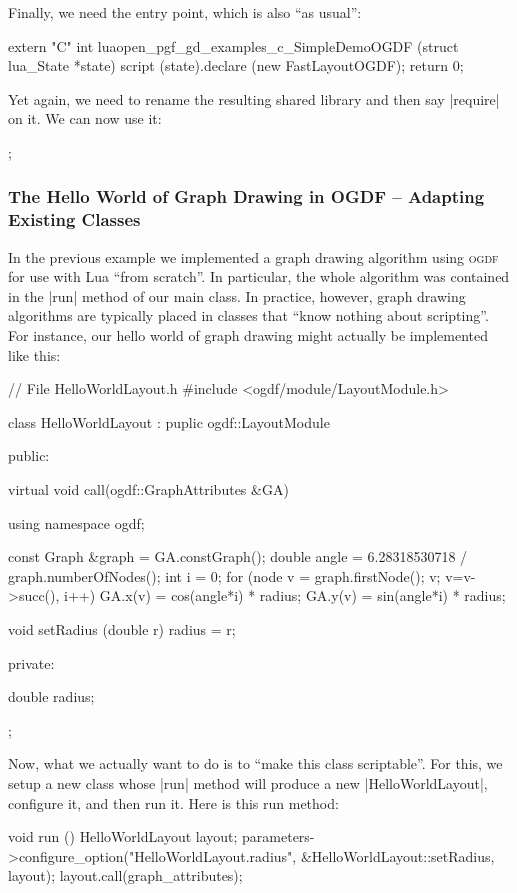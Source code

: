 Finally, we need the entry point, which is also ``as usual'':
%
\begin{codeexample}[code only, tikz syntax=false]
extern "C" int luaopen_pgf_gd_examples_c_SimpleDemoOGDF (struct lua_State *state) {
  script (state).declare (new FastLayoutOGDF);
  return 0;
}
\end{codeexample}

Yet again, we need to rename the resulting shared library and then say
|require| on it. We can now use it:
%
\begin{codeexample}
\tikz {};
\end{codeexample}


\subsubsection{The Hello World of Graph Drawing in OGDF -- Adapting Existing Classes}

In the previous example we implemented a graph drawing algorithm using
\textsc{ogdf} for use with Lua ``from scratch''. In particular, the whole
algorithm was contained in the |run| method of our main class. In practice,
however, graph drawing algorithms are typically placed in classes that ``know
nothing about scripting''. For instance, our hello world of graph drawing might
actually be implemented like this:
%
\begin{codeexample}[code only, tikz syntax=false]
// File HelloWorldLayout.h
#include <ogdf/module/LayoutModule.h>

class HelloWorldLayout : puplic ogdf::LayoutModule {
public:

  virtual void call(ogdf::GraphAttributes &GA)
  {
    using namespace ogdf;

    const Graph &graph = GA.constGraph();
    double angle  = 6.28318530718 / graph.numberOfNodes();
    int i = 0;
    for (node v = graph.firstNode(); v; v=v->succ(), i++) {
      GA.x(v) = cos(angle*i) * radius;
      GA.y(v) = sin(angle*i) * radius;
    }
  }

  void setRadius (double r) { radius = r; }

private:

  double radius;
};
\end{codeexample}

Now, what we actually want to do is to ``make this class scriptable''. For
this, we setup a new class whose |run| method will produce a new
|HelloWorldLayout|, configure it, and then run it. Here is this run method:
%
\begin{codeexample}[code only, tikz syntax=false]
void run ()
{
  HelloWorldLayout layout;
  parameters->configure_option("HelloWorldLayout.radius", &HelloWorldLayout::setRadius, layout);
  layout.call(graph_attributes);
}
\end{codeexample}

